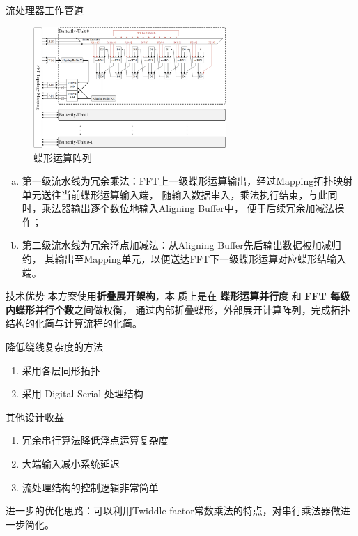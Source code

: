\documentclass[8pt]{ctexbeamer}
\begin{document}
\begin{frame}{流处理器工作管道}
	\begin{center}
		\begin{figure}
			\centering
			\includegraphics[width=0.65\textwidth]{figure/Figure4.Float_BU.png}
			\caption{蝶形运算阵列}
			\label{fig:Float_BU}
		\end{figure}

		\begin{enumerate}[a)]
			\item {\scriptsize 第一级流水线为冗余乘法：FFT上一级蝶形运算输出，经过Mapping拓扑映射单元送往当前蝶形运算输入端，
			随输入数据串入，乘法执行结束，与此同时，乘法器输出逐个数位地输入Aligning Buffer中，
			便于后续冗余加减法操作； }
			\item {\scriptsize 第二级流水线为冗余浮点加减法：从Aligning Buffer先后输出数据被加减归约，
			其输出至Mapping单元，以便送达FFT下一级蝶形运算对应蝶形结输入端。}
		\end{enumerate}
	\end{center}
\end{frame}

\begin{frame}{技术优势}
	本方案使用\textbf{折叠展开架构}，本
	质上是在 \textbf{蝶形运算并行度} 和 \textbf{\textbf{FFT} 每级内蝶形并行个数}之间做权衡，
	通过内部折叠蝶形，外部展开计算阵列，完成拓扑结构的化简与计算流程的化简。

	\begin{block}{降低绕线复杂度的方法}
		\begin{enumerate}
			\item 采用各层同形拓扑
			\item 采用 Digital Serial 处理结构
		\end{enumerate}
	\end{block}

	\begin{block}{其他设计收益}
		\begin{enumerate}
			\item 冗余串行算法降低浮点运算复杂度
			\item 大端输入减小系统延迟
			\item 流处理结构的控制逻辑非常简单
		\end{enumerate}
	\end{block}

	进一步的优化思路：可以利用Twiddle factor常数乘法的特点，对串行乘法器做进一步简化。

\end{frame}
\end{document}
